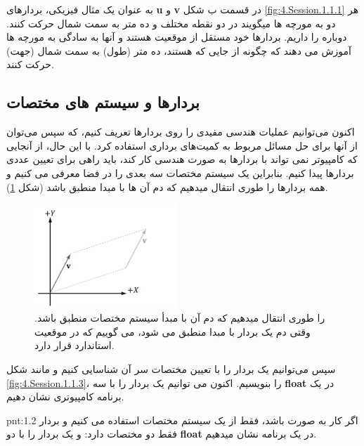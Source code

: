 {\begin{spacing}{1.4}
        به عنوان یک مثال فیزیکی، بردارهای \textbf{u} و \textbf{v} در قسمت ب شکل \ref{fig:4.Session.1.1.1} هر دو به مورچه ها میگویند در دو نقطه مختلف  و  ده متر به سمت شمال حرکت کنند.
        دوباره  را داریم.
        بردارها خود مستقل از موقعیت هستند و
        آنها به سادگی به مورچه ها آموزش می دهند که چگونه از جایی که هستند، ده متر (طول) به سمت شمال (جهت) حرکت کنند.

    \end{spacing}
}

\subsection{\textbf{بردارها و سیستم های مختصات}}
\label{subsec:1.1.1}
{
    \Large
    \begin{spacing}{1.5}
        اکنون می‌توانیم عملیات هندسی مفیدی را روی بردارها تعریف کنیم، که سپس می‌توان از آنها برای حل مسائل مربوط به کمیت‌های برداری استفاده کرد.
        با این حال، از آنجایی که کامپیوتر نمی تواند با بردارها به صورت هندسی کار کند، باید راهی برای تعیین عددی بردارها پیدا کنیم.
        بنابراین یک سیستم مختصات سه بعدی را در فضا معرفی می کنیم و همه بردارها را طوری انتقال میدهیم که دم آن ها با مبدا منطبق باشد (شکل \ref{fig:4.Session.1.1.2}).

        \begin{figure}[H]
            \centering
            \setlength{\belowcaptionskip}{-10pt}
            \includegraphics[width=0.48\textwidth]{Images/4/1/4.Session.1.1.2}
            \caption{ را طوری انتقال میدهیم که دم آن با مبدأ سیستم مختصات منطبق
            باشد. وقتی دم یک بردار با مبدا منطبق می شود، می گوییم که در موقعیت استاندارد قرار دارد.}
            \label{fig:4.Session.1.1.2}
        \end{figure}

        سپس می‌توانیم یک بردار را با تعیین مختصات سر آن شناسایی کنیم و مانند شکل \ref{fig:4.Session.1.1.3}،  را بنویسیم.
        اکنون می توانیم یک بردار را با سه \textbf{float} در یک برنامه کامپیوتری نشان دهیم.
        \textbf{\vspace{-10pt}}
        \begin{point}{pnt:1.2}
            \Large
            اگر کار به صورت  باشد، فقط از یک سیستم مختصات  استفاده می کنیم و بردار فقط دو مختصات دارد:
             و یک بردار را با دو \textbf{float} در یک برنامه نشان میدهیم.
        \end{point}


\end{spacing}}
